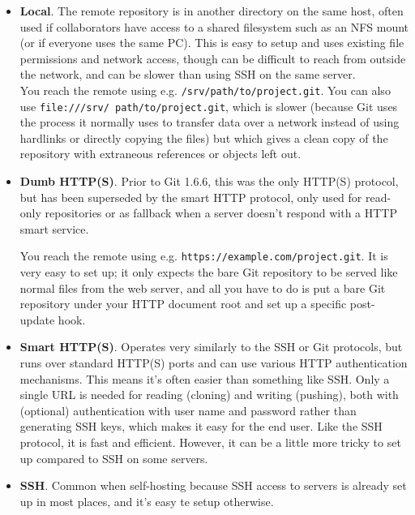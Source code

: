 \documentclass[table, xcdraw]{article}%
\begin{document}
\begin{itemize}
    \item \textbf{Local}. The remote repository is in another directory on the same host, often used if collaborators have access to a shared filesystem such as an NFS mount (or if everyone uses the same PC). This is easy to setup and uses existing file permissions and network access, though can be difficult to reach from outside the network, and can be slower than using SSH on the same server.\\
    
    You reach the remote using e.g. \texttt{/srv/path/to/project.git}. You can also use \texttt{file:///srv/ path/to/project.git}, which is slower (because Git uses the process it normally uses to transfer data over a network instead of using hardlinks or directly copying the files) but which gives a clean copy of the repository with extraneous references or objects left out.
    \item \textbf{Dumb HTTP(S)}. Prior to Git 1.6.6, this was the only HTTP(S) protocol, but has been superseded by the smart HTTP protocol, only used for read-only repositories or as fallback when a server doesn't respond with a HTTP smart service.
    
    You reach the remote using e.g. \texttt{https://example.com/project.git}. It is very easy to set up; it only expects the bare Git repository to be served like normal files from the web server, and all you have to do is put a bare Git repository under your HTTP document root and set up a specific post-update hook.
    
    
    \item \textbf{Smart HTTP(S)}. Operates very similarly to the SSH or Git protocols, but runs over standard HTTP(S) ports and can use various HTTP authentication mechanisms. This means it's often easier than something like SSH. Only a single URL is needed for reading (cloning) and writing (pushing), both with (optional) authentication with user name and password rather than generating SSH keys, which makes it easy for the end user. Like the SSH protocol, it is fast and efficient. However, it can be a little more tricky to set up compared to SSH on some servers.
    \item \textbf{SSH}. Common when self-hosting because SSH access to servers is already set up in most places, and it's easy te setup otherwise.
    

\end{itemize}
\end{document}
